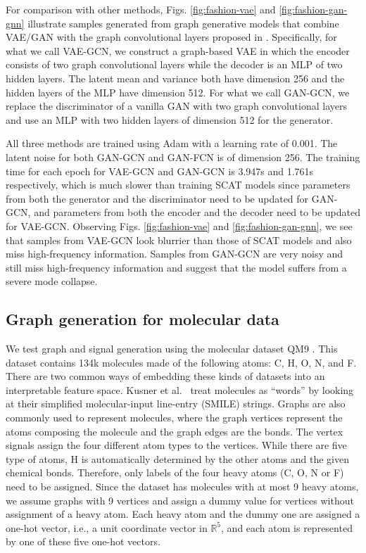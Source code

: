 \documentclass[conference]{IEEEtran}
\def\RR{\mathbb{R}}
\begin{document}
For comparison with other methods, Figs. \ref{fig:fashion-vae} and \ref{fig:fashion-gan-gnn} illustrate samples generated from graph generative models that combine VAE/GAN with the graph convolutional layers proposed in \cite{kipf2016semi}. Specifically, for what we call VAE-GCN, we construct a graph-based VAE in which the encoder consists of two graph convolutional layers while the decoder is an MLP of two hidden layers. The latent mean and variance both have dimension 256 and the hidden layers of the MLP have dimension 512. For what we call GAN-GCN, we replace the discriminator of a vanilla GAN with two graph convolutional layers and use an MLP with two hidden layers of dimension 512 for the generator. 
  
All three methods are trained using Adam with a learning rate of 0.001. The latent noise for both GAN-GCN and GAN-FCN is of dimension 256. The training time for each epoch for VAE-GCN and GAN-GCN is 3.947s and 1.761s respectively, which is much slower than training SCAT models since parameters from both the generator and the discriminator need to be updated for GAN-GCN, and parameters from both the encoder and the decoder need to be updated for VAE-GCN. Observing Figs. \ref{fig:fashion-vae} and \ref{fig:fashion-gan-gnn}, we see that samples from VAE-GCN look blurrier than those of SCAT models and also miss high-frequency information. Samples from GAN-GCN are very noisy and still miss high-frequency information and suggest that the model suffers from a severe mode collapse. 

 









\subsection{Graph generation for molecular data}\label{subsec:graphgen}
We test graph and signal generation using the molecular dataset QM9 \cite{ramakrishnan2014quantum}. This dataset contains 134k molecules made of the following atoms: C, H, O, N, and F. There are two common ways of embedding these kinds of datasets into an interpretable feature space. Kusner et al.~\cite{kusner2017grammar} treat molecules as ``words'' by looking at their simplified molecular-input line-entry (SMILE) strings.
Graphs are also commonly used to represent molecules, where the graph vertices represent the atoms composing the molecule and the graph edges are the bonds. The vertex signals assign the four different atom types to the vertices. While there are five type of atoms, H is automatically determined by the other atoms and the given chemical bonds. Therefore, only labels of the four heavy atoms (C, O, N or F) need to be assigned. Since the dataset has molecules with at most 9 heavy atoms, we assume graphs with 9 vertices and assign a dummy value for vertices without assignment of a heavy atom.
Each heavy atom and the dummy one are assigned a one-hot vector, i.e., a unit coordinate vector in $\RR^5$, and each atom is represented by one of these five one-hot vectors.
\end{document}
